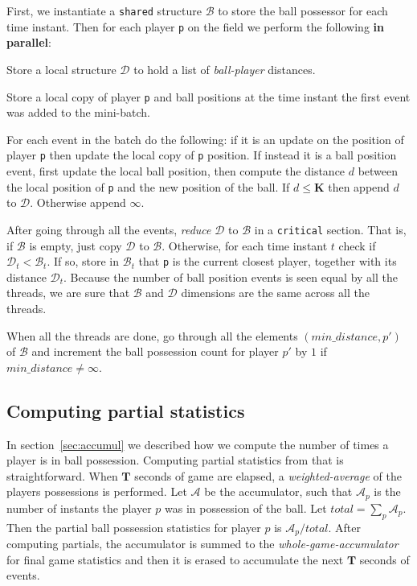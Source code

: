 \documentclass[a4paper, 11pt]{article}
\begin{document}
\begin{multicols}{2}
First, we instantiate a \texttt{shared} structure $\mathcal{B}$ to store the ball possessor for each time instant. Then for each player \texttt{p} on the field we perform the following \textbf{in parallel}:
\begin{enumerate*}[(a)]
    \item Store a local structure $\mathcal{D}$ to hold a list of \textit{ball-player} distances.
    \item Store a local copy of player \texttt{p} and ball positions at the time instant the first event was added to the mini-batch.
    \item For each event in the batch do the following: if it is an update on the position of player \texttt{p} then update the local copy of \texttt{p} position. If instead it is a ball position event, first update the local ball position, then compute the distance $d$ between the local position of \texttt{p} and the new position of the ball. If $d \leq \mathbf{K}$ then append $d$ to $\mathcal{D}$. Otherwise append $\infty$.
    \item After going through all the events, \textit{reduce} $\mathcal{D}$ to $\mathcal{B}$ in a \texttt{critical} section. That is, if $\mathcal{B}$ is empty, just copy $\mathcal{D}$ to $\mathcal{B}$. Otherwise, for each time instant $t$ check if $\mathcal{D}_t < \mathcal{B}_t$. If so, store in $\mathcal{B}_t$ that \texttt{p} is the current closest player, together with its distance $\mathcal{D}_t$. Because the number of ball position events is seen equal by all the threads, we are sure that $\mathcal{B}$ and $\mathcal{D}$ dimensions are the same across all the threads.
    \item When all the threads are done, go through all the elements $(min\_distance, p')$ of $\mathcal{B}$ and increment the ball possession count for player $p'$ by $1$ if $min\_distance \neq \infty$.
\end{enumerate*}

\subsection{Computing partial statistics}
In section~\ref{sec:accumul} we described how we compute the number of times a player is in ball possession. Computing partial statistics from that is straightforward. When $\mathbf{T}$ seconds of game are elapsed, a \textit{weighted-average} of the players possessions is performed. Let $\mathcal{A}$ be the accumulator, such that $\mathcal{A}_p$ is the number of instants the player $p$ was in possession of the ball. Let $total = \sum_p \mathcal{A}_p$. Then the partial ball possession statistics for player $p$ is $\mathcal{A}_p / total$. After computing partials, the accumulator is summed to the \emph{whole-game-accumulator} for final game statistics and then it is erased to accumulate the next $\mathbf{T}$ seconds of events.


\end{multicols}
\end{document}
